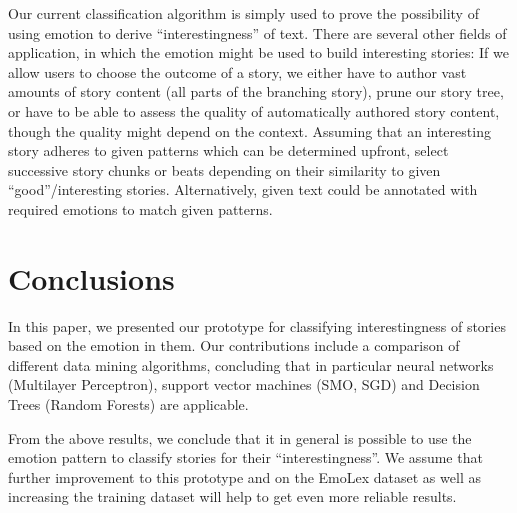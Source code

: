 \documentclass[letterpaper]{article}
\begin{document}
Our current classification algorithm is simply used to prove the possibility of using emotion to derive ``interestingness'' of text. There are several other fields of application, in which the emotion might be used to build interesting stories: If we allow users to choose the outcome of a story, we either have to author vast amounts of story content (all parts of the branching story), prune our story tree, or have to be able to assess the quality of automatically authored story content, though the quality might depend on the context. Assuming that an interesting story adheres to given patterns which can be determined upfront, select successive story chunks or beats depending on their similarity to given ``good''/interesting stories. Alternatively, given text could be annotated with required emotions to match given patterns. 


\section{Conclusions}

In this paper, we presented our prototype for classifying interestingness of stories based on the emotion in them. Our contributions include a comparison of different data mining algorithms, concluding that in particular neural networks (Multilayer Perceptron), support vector machines (SMO, SGD) and Decision Trees (Random Forests) are applicable. 

From the above results, we conclude that it in general is possible to use the emotion pattern to classify stories for their ``interestingness''. We assume that further improvement to this prototype and on the EmoLex dataset as well as increasing the training dataset will help to get even more reliable results. 

\addtolength{\textheight}{-12cm}   %



\end{document}
